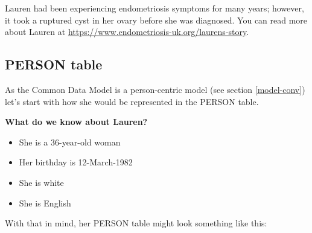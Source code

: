 \documentclass[11pt]{book}
\providecommand{\tightlist}{%
  \setlength{\itemsep}{0pt}\setlength{\parskip}{0pt}}
\theoremstyle{definition}
\theoremstyle{definition}
\theoremstyle{definition}
\theoremstyle{remark}
\begin{document}
Lauren had been experiencing endometriosis symptoms for many years; however, it took a ruptured cyst in her ovary before she was diagnosed. You can read more about Lauren at \url{https://www.endometriosis-uk.org/laurens-story}.

\hypertarget{person}{%
\subsection{PERSON table}\label{person}}

As the Common Data Model is a person-centric model (see section \ref{model-conv}) let's start with how she would be represented in the PERSON table.

\textbf{What do we know about Lauren?}

\begin{itemize}
\tightlist
\item
  She is a 36-year-old woman
\item
  Her birthday is 12-March-1982
\item
  She is white
\item
  She is English
\end{itemize}

With that in mind, her PERSON table might look something like this:
\end{document}
